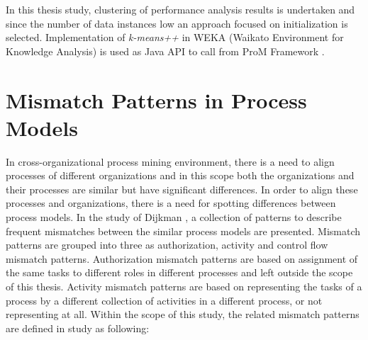 In this thesis study, clustering of performance analysis results is undertaken and since the number of data instances low an approach focused on initialization is selected. Implementation of \textit{k-means++} in WEKA (Waikato Environment for Knowledge
Analysis) \cite{hall2009} is used as Java API to call from ProM Framework \cite{verbeek2010prom}. 

\section{Mismatch Patterns in Process Models}
\label{sec:mismatch-patterns-in-process-models}

In cross-organizational process mining environment, there is a need to align processes of different organizations and in this scope both the organizations and their processes are similar but have significant differences. In order to align these processes and organizations, there is a need for spotting differences between process models. In the study of Dijkman \cite{dijkman2007mismatch}, a collection of patterns to describe frequent mismatches between the similar process models are presented. Mismatch patterns are grouped into three as authorization, activity and control flow mismatch patterns. Authorization mismatch patterns are based on assignment of the same tasks to different roles in different processes and left outside the scope of this thesis. Activity mismatch patterns are based on representing the tasks of a process by a different collection of activities in a different process, or not representing at all. Within the scope of this study, the related mismatch patterns are defined in study \cite{dijkman2007mismatch} as following:
